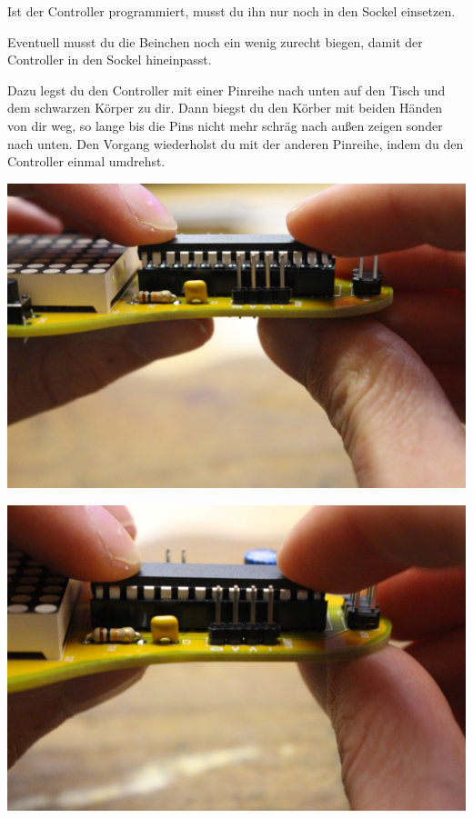 \documentclass{article}
\begin{document}
Ist der Controller programmiert, musst du ihn nur noch in den Sockel einsetzen.

Eventuell musst du die Beinchen noch ein wenig zurecht biegen, damit der Controller in den Sockel hineinpasst. 

Dazu legst du den Controller mit einer Pinreihe nach unten auf den Tisch und dem schwarzen Körper zu dir. Dann biegst du den Körber mit beiden Händen von dir weg, so lange bis die Pins nicht mehr schräg nach außen zeigen sonder nach unten.
Den Vorgang wiederholst du mit der anderen Pinreihe, indem du den Controller einmal umdrehst.

\begin{minipage}[b]{0.5\textwidth}
	\includegraphics[width=\textwidth]{Bilder/IMG_5620.JPG}
	\label{fig:}
\end{minipage}
\begin{minipage}[b]{0.5\textwidth}
	\includegraphics[width=\textwidth]{Bilder/IMG_5622.JPG}
	\label{fig:}
\end{minipage}
\end{document}
